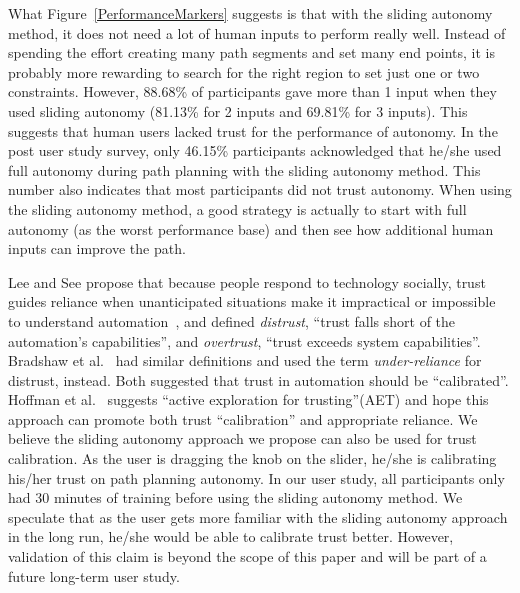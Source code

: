 \documentclass[journal]{IEEEtran}
\begin{document}
What Figure~\ref{PerformanceMarkers} suggests is that with the sliding autonomy method, it does not need a lot of human inputs to perform really well. Instead of spending the effort creating many path segments and set many end points, it is probably more rewarding to search for the right region to set just one or two constraints. However, 88.68\% of participants gave more than 1 input when they used sliding autonomy (81.13\% for 2 inputs and 69.81\% for 3 inputs). This suggests that human users lacked trust for the performance of autonomy. In the post user study survey, only 46.15\% participants acknowledged that he/she used full autonomy during path planning with the sliding autonomy method. This number also indicates that most participants did not trust autonomy. When using the sliding autonomy method, a good strategy is actually to start with full autonomy (as the worst performance base) and then see how additional human inputs can improve the path.


Lee and See propose that because people respond to technology socially, trust guides reliance when unanticipated situations make it impractical or impossible to understand automation~\cite{Lee2004Trust}, and defined \textit{distrust}, ``trust falls short of the automation's capabilities'', and \textit{overtrust}, ``trust exceeds system capabilities''. Bradshaw et al.\ \cite{Bradshaw2013Seven} had similar definitions and used the term \textit{under-reliance} for distrust, instead. Both suggested that trust in automation should be ``calibrated''. Hoffman et al.\ \cite{Hoffman2013Trust} suggests ``active exploration for trusting''(AET) and hope this approach can promote both trust ``calibration'' and appropriate reliance. We believe the sliding autonomy approach we propose can also be used for trust calibration. As the user is dragging the knob on the slider, he/she is calibrating his/her trust on path planning autonomy. In our user study, all participants only had 30 minutes of training before using the sliding autonomy method. We speculate that as the user gets more familiar with the sliding autonomy approach in the long run, he/she would be able to calibrate trust better. However, validation of this claim is beyond the scope of this paper and will be part of a future long-term user study.
\end{document}
